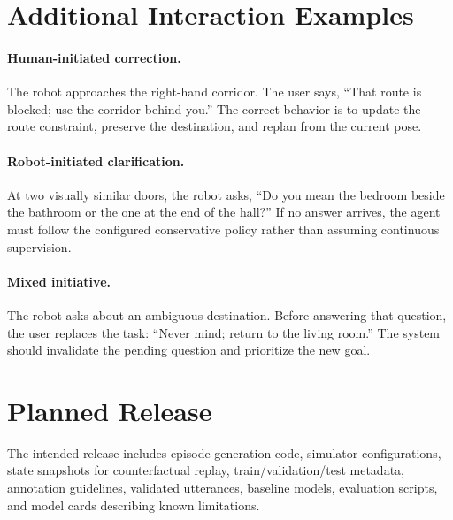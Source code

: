 \documentclass[10pt]{article}
\begin{document}
\section{Additional Interaction Examples}

\paragraph{Human-initiated correction.}
The robot approaches the right-hand corridor. The user says, ``That route is
blocked; use the corridor behind you.'' The correct behavior is to update the
route constraint, preserve the destination, and replan from the current pose.

\paragraph{Robot-initiated clarification.}
At two visually similar doors, the robot asks, ``Do you mean the bedroom beside
the bathroom or the one at the end of the hall?'' If no answer arrives, the
agent must follow the configured conservative policy rather than assuming
continuous supervision.

\paragraph{Mixed initiative.}
The robot asks about an ambiguous destination. Before answering that question,
the user replaces the task: ``Never mind; return to the living room.'' The
system should invalidate the pending question and prioritize the new goal.

\section{Planned Release}

The intended release includes episode-generation code, simulator
configurations, state snapshots for counterfactual replay, train/validation/test
metadata, annotation guidelines, validated utterances, baseline models,
evaluation scripts, and model cards describing known limitations.
\end{document}
